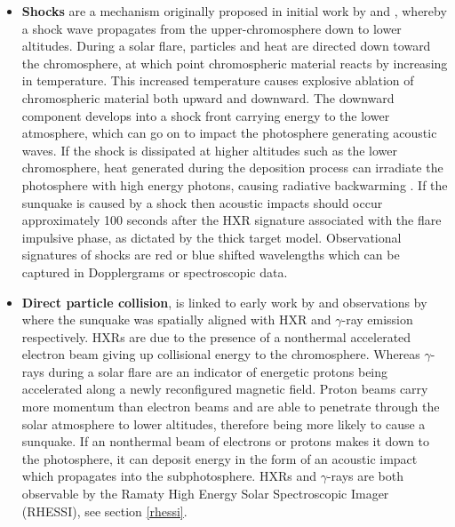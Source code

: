 \begin{itemize}
\item \textbf{Shocks} are a mechanism originally proposed in initial work by \cite{1995ESASP.376b.341K} and \cite{1998Natur.393..317K}, whereby a shock wave propagates from the upper-chromosphere down to lower altitudes. During a solar flare, particles and heat are directed down toward the chromosphere, at which point chromospheric material reacts by increasing in temperature. This increased temperature causes explosive ablation of chromospheric material both upward and downward. The downward component develops into a shock front carrying energy to the lower atmosphere, which can go on to impact the photosphere generating acoustic waves. If the shock is dissipated at higher altitudes such as the lower chromosphere, heat generated during the deposition process can irradiate the photosphere with high energy photons, causing radiative backwarming \citep{1989SoPh..124..303M}. If the sunquake is caused by a shock then acoustic impacts should occur approximately 100 seconds after the HXR signature associated with the flare impulsive phase, as dictated by the thick target model. Observational signatures of shocks are red or blue shifted wavelengths which can be captured in Dopplergrams or spectroscopic data. \\

\item \textbf{Direct particle collision}, is linked to early work by \cite{1998Natur.393..317K} and observations by \cite{2007ApJ...664..573Z} where the sunquake was spatially aligned with HXR and $\gamma$-ray emission respectively. HXRs are due to the presence of a nonthermal accelerated electron beam giving up collisional energy to the chromosphere. Whereas $\gamma$-rays during a solar flare are an indicator of energetic protons being accelerated along a newly reconfigured magnetic field. Proton beams carry more momentum than electron beams and are able to penetrate through the solar atmosphere to lower altitudes, therefore being more likely to cause a sunquake. If an nonthermal beam of electrons or protons makes it down to the photosphere, it can deposit energy in the form of an acoustic impact which propagates into the subphotosphere. HXRs and $\gamma$-rays are both observable by the Ramaty High Energy Solar Spectroscopic Imager (RHESSI), see section \ref{rhessi}. \\

\end{itemize}


